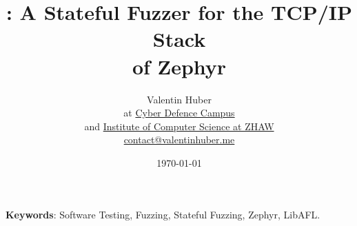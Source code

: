 \documentclass{article}
\title{%
    \vspace{50px}%
    \Huge \proj : A Stateful Fuzzer for the TCP/IP Stack\\of Zephyr
    \vspace{250px}%
}
\author{%
    Valentin Huber\vspace{5px}\\%
    \small at \href{https://www.cydcampus.admin.ch/}{Cyber Defence Campus}\\%
    \small and \href{https://www.zhaw.ch/en/engineering/institutes-centres/init/}{Institute of Computer Science at ZHAW}\\%
    \small \href{mailto://contact@valentinhuber.me}{contact@valentinhuber.me}%
    \vspace{10px}
    \todo{fix title page}
}
\date{\today}
\begin{document}
\maketitle

\clearpage\newpage
\begin{center}
  \begin{minipage}{0.8\textwidth}
    \vspace{70px}

    \begin{abstract}
      \lipsum[1]\lipsum[2]\lipsum[3]
    \end{abstract}
  \end{minipage}

  \vspace{70px}

  \begin{minipage}{0.7\textwidth}
    \textbf{Keywords}: Software Testing, Fuzzing, Stateful Fuzzing, Zephyr, LibAFL.
  \end{minipage}
\end{center}

\clearpage\newpage
\end{document}
